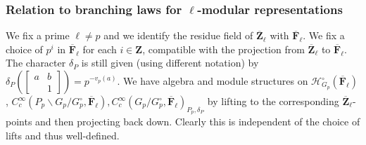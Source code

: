\documentclass{amsart}%
\theoremstyle{plain}
\theoremstyle{plain}
\theoremstyle{remark}
\begin{document}
\subsubsection{Relation to branching laws for $\ell$-modular representations} We fix a prime $\ell\neq p$ and we identify the residue field of $\overline{\mathbf{Z}}_\ell$ with $\overline{\mathbf{F}}_\ell$. We fix a choice of $p^i$ in $\overline{\mathbf
F}_\ell$ for each $i\in\mathbf
{Z}$, compatible with the projection from $\overline{\mathbf{Z}}_\ell$ to $\overline{\mathbf{F}}_\ell$. The character $\delta_P$ is still given (using different notation) by $\delta_P(\left[\begin{smallmatrix}
    a & b\\
     & 1
\end{smallmatrix}\right])=p^{-v_p(a)}$. We have algebra and module structures on $\mathcal{H}_{G_p}^\circ(\overline{\mathbf{F}}_\ell)$, $C_c^\infty(P_p\backslash G_p/G_p^\circ,\overline{\mathbf{F}}_\ell), C_c^\infty(G_p/G_p^\circ,\overline{\mathbf{F}}_\ell)_{P_p,\delta_P}$ by lifting to the corresponding $\overline{\mathbf{Z}}_\ell$-points and then projecting back down. Clearly this is independent of the choice of lifts and thus well-defined. 
\end{document}

